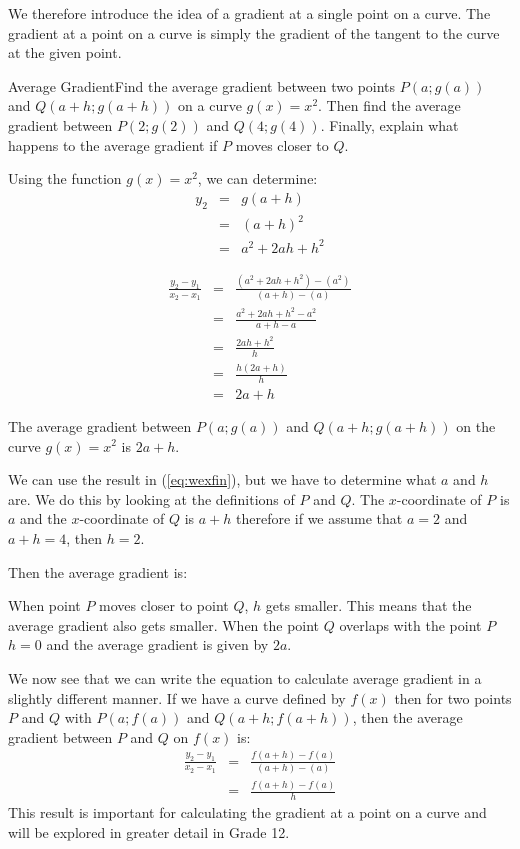 We therefore introduce the idea of a gradient at a single point on a curve. The gradient at a point on a curve is simply the gradient of the tangent to the curve at the given point. 

\begin{wex}{Average Gradient}{Find the average gradient between two points $P(a;g(a))$ and $Q(a+h;g(a+h))$ on a curve $g(x)=x^2$. Then find the average gradient between $P(2;g(2))$ and $Q(4;g(4))$. Finally, explain what happens to the average gradient if $P$ moves closer to $Q$.}
{

Using the function $g(x)=x^2$, we can determine:
\begin{eqnarray*}
y_2&=&g(a+h)\\
&=&(a+h)^2\\
&=&a^2+2ah+h^2
\end{eqnarray*}

\begin{eqnarray}
\nonumber
\frac{y_2-y_1}{x_2-x_1}&=&\frac{(a^2+2ah+h^2)-(a^2)}{(a+h)-(a)}\\
\nonumber
&=&\frac{a^2+2ah+h^2-a^2}{a+h-a}\\
\nonumber
&=&\frac{2ah+h^2}{h}\\
\nonumber
&=&\frac{h(2a+h)}{h}\\
\label{eq:wexfin}
&=&2a+h
\end{eqnarray}

The average gradient between $P(a;g(a))$ and $Q(a+h;g(a+h))$ on the curve $g(x)=x^2$ is $2a+h$.

We can use the result in (\ref{eq:wexfin}), but we have to determine what $a$ and $h$ are. We do this by looking at the definitions of $P$ and $Q$. The $x$-coordinate of $P$ is $a$ and the $x$-coordinate of $Q$ is $a+h$ therefore if we assume that $a=2$ and $a+h=4$, then $h=2$.

Then the average gradient is:

When point $P$ moves closer to point $Q$, $h$ gets smaller. This means that the average gradient also gets smaller. When the point $Q$ overlaps with the point $P$ $h=0$ and the average gradient is given by $2a$.
}
\end{wex}

We now see that we can write the equation to calculate average gradient in a slightly different manner. If we have a curve defined by $f(x)$ then for two points $P$ and $Q$ with $P(a;f(a))$ and $Q(a+h;f(a+h))$, then the average gradient between $P$ and $Q$ on $f(x)$ is:
\begin{eqnarray*}
\frac{y_2-y_1}{x_2-x_1}&=&\frac{f(a+h)-f(a)}{(a+h)-(a)}\\
&=&\frac{f(a+h)-f(a)}{h}
\end{eqnarray*}
This result is important for calculating the gradient at a point on a curve and will be explored in greater detail in Grade 12.


